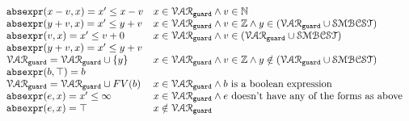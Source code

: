   \[
    \begin{array}{ll} 
      \absexpr(x - v, x)  = x' \leq x - v  & x \in \grdvar \land v \in \mathbb{N} \\
      \absexpr(y + v, x)  = x' \leq y + v  & x \in \grdvar \land v \in \mathbb{Z} \land y \in (\grdvar \cup \constdom) \\
      \absexpr(v, x)  = x' \leq v + 0  & x \in \grdvar \land v \in (\grdvar \cup \constdom) \\
      \absexpr(y + v, x)  = x' \leq y + v & \\
      \grdvar = \grdvar \cup \{y\} & x \in \grdvar \land v \in \mathbb{Z} \land y \notin (\grdvar \cup \constdom)  \\
      \absexpr(\bexpr, \top) = \bexpr   & \\
      \grdvar = \grdvar \cup FV(\bexpr) &  x \in \grdvar \land \bexpr \text{ is a boolean expression} \\
      \absexpr(\expr, x) = x' \leq \infty  &  x \in \grdvar \land \expr \text{ doesn't have any of the forms as above} \\
      \absexpr(\expr, x) = \top  &  x \notin \grdvar \\
    \end{array}
    \]
  
